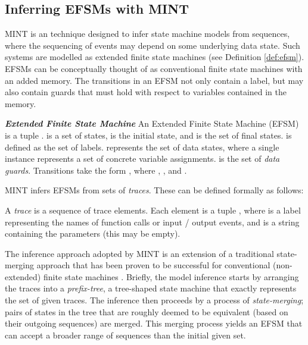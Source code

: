 \documentclass{llncs}
\begin{document}
\subsection{Inferring EFSMs with MINT}
\label{sub:inferringEfsms}
MINT \cite{WalkinshawWCRE} is an technique designed to infer state machine models from sequences, where the sequencing of events may depend on some underlying data state. Such systems are modelled as extended finite state machines (see Definition \ref{def:efsm}). EFSMs can be conceptually thought of as conventional finite state machines with an added memory. The transitions in an EFSM not only contain a label, but may also contain guards that must hold with respect to variables contained in the memory.

\begin{definition}\textbf{\emph{Extended Finite State Machine}}
\label{def:efsm}
 An Extended Finite State Machine (EFSM)  is a tuple .  is a set of states,  is the initial state, and  is the set of final states.  is defined as the set of labels.  represents the set of data states, where a single instance  represents a set of concrete variable assignments.  is the set of \emph{data guards}. Transitions  take the form , where , , and . 
\end{definition}

MINT infers EFSMs from sets of \emph{traces}. These can be defined formally as follows:

\begin{definition}
\label{def:traces}
A \emph{trace}  is a sequence of  trace elements. Each element  is a tuple , where  is a label representing the names of function calls or input / output events, and  is a string containing the parameters (this may be empty).
\end{definition}

The inference approach adopted by MINT \cite{WalkinshawWCRE} is an extension of a traditional state-merging approach \cite{Lang1998} that has been proven to be successful for conventional (non-extended) finite state machines \cite{WalkinshawStamina}. Briefly, the model inference starts by arranging the traces into a \emph{prefix-tree}, a tree-shaped state machine that exactly represents the set of given traces. The inference then proceeds by a process of \emph{state-merging}; pairs of states in the tree that are roughly deemed to be equivalent (based on their outgoing sequences) are merged. This merging process yields an EFSM that can accept a broader range of sequences than the initial given set.
\end{document}

